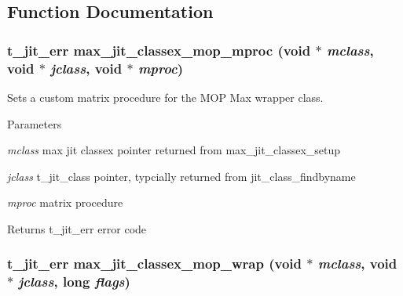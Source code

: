 \subsection{Function Documentation}
\hypertarget{group__maxmopmod_ga2641dd1bad637ebd190b858d2d72e928}{
\subsubsection[{max\_\-jit\_\-classex\_\-mop\_\-mproc}]{\setlength{\rightskip}{0pt plus 5cm}t\_\-jit\_\-err max\_\-jit\_\-classex\_\-mop\_\-mproc (void $\ast$ {\em mclass}, \/  void $\ast$ {\em jclass}, \/  void $\ast$ {\em mproc})}}
\label{group__maxmopmod_ga2641dd1bad637ebd190b858d2d72e928}


Sets a custom matrix procedure for the MOP Max wrapper class. 
\begin{DoxyParams}{Parameters}
\item[{\em mclass}]max jit classex pointer returned from max\_\-jit\_\-classex\_\-setup \item[{\em jclass}]t\_\-jit\_\-class pointer, typcially returned from jit\_\-class\_\-findbyname \item[{\em mproc}]matrix procedure\end{DoxyParams}
\begin{DoxyReturn}{Returns}
t\_\-jit\_\-err error code 
\end{DoxyReturn}
\hypertarget{group__maxmopmod_ga7e08584771f58ce1fe0b190d27b5759b}{
\subsubsection[{max\_\-jit\_\-classex\_\-mop\_\-wrap}]{\setlength{\rightskip}{0pt plus 5cm}t\_\-jit\_\-err max\_\-jit\_\-classex\_\-mop\_\-wrap (void $\ast$ {\em mclass}, \/  void $\ast$ {\em jclass}, \/  long {\em flags})}}
\label{group__maxmopmod_ga7e08584771f58ce1fe0b190d27b5759b}


